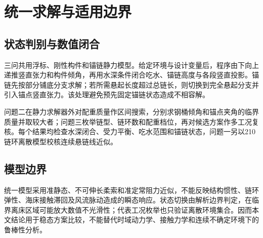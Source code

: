\section{统一求解与适用边界}

\subsection{状态判别与数值闭合}

三问共用浮标、刚性构件和锚链静力模型。给定环境与设计变量后，程序由下向上递推竖直张力和构件倾角，再用水深条件闭合吃水、锚链高度与各段竖直投影。锚链先按部分铺底分支求解；若所需悬起长度超过总链长，则切换到完全悬起分支并引入锚点竖直张力。该处理避免预先固定锚链状态造成不相容解。

问题二在静力求解器外对配重质量作区间搜索，分别求钢桶倾角和锚点夹角的临界质量并取较大者；问题三枚举链型、链环数和配重档位，再对候选方案作多工况复核。每个结果均检查水深闭合、受力平衡、吃水范围和锚链状态，问题一另以210链环离散模型校核连续悬链线近似。

\subsection{模型边界}

统一模型采用准静态、不可伸长柔索和准定常阻力近似，不能反映结构惯性、链环弹性、海床接触滞回及风流脉动造成的瞬态响应。状态切换由解析边界判定，在临界离床区域可能放大数值不光滑性；代表工况枚举也只验证离散环境集合。因而本文结论用于稳态方案比较，不能替代时域动力学、接触力学和连续不确定环境下的鲁棒性分析。
